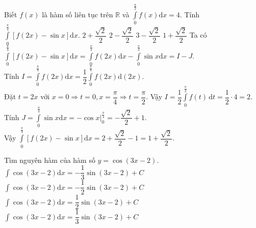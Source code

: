 \begin{ex}%
Biết $f(x)$ là hàm số liên tục trên $\mathbb{R}$ và $\displaystyle\int\limits_0^{\frac{\pi}{2}}f(x)\mathrm{d}x=4$. Tính $\displaystyle\int\limits_0^{\frac{\pi}{4}}\left[f(2x)-\sin x\right]\mathrm{d}x$.
\choice
{$2+\dfrac{\sqrt{2}}{2}$}
{$2-\dfrac{\sqrt{2}}{2}$}
{$3-\dfrac{\sqrt{2}}{2}$}
{\True $1+\dfrac{\sqrt{2}}{2}$}
\loigiai
{Ta có $\displaystyle\int\limits_0^{\frac{\pi}{4}}\left[f(2x)-\sin x\right]\mathrm{d}x=\displaystyle\int\limits_0^{\frac{\pi}{4}}f(2x)\mathrm{d}x-\displaystyle\int\limits_0^{\frac{\pi}{4}}\sin x\mathrm{d}x=I-J$.\\Tính $I=\displaystyle\int\limits_0^{\frac{\pi}{4}}f(2x)\mathrm{d}x=\dfrac{1}{2}\displaystyle\int\limits_0^{\frac{\pi}{4}}f(2x)\mathrm{d}(2x)$.\\
Đặt $ t=2x $ với $x=0\Rightarrow t=0, x=\dfrac{\pi}{4}\Rightarrow t=\dfrac{\pi}{2} $. Vậy $ I=\dfrac{1}{2}\displaystyle\int\limits_0^{\frac{\pi}{2}} f(t) \mathrm{\,d}t=\dfrac{1}{2}\cdot 4=2 $.\\
Tính $J=\displaystyle\int\limits_0^{\frac{\pi}{4}}\sin x\mathrm{d}x=-\cos x \bigg | _0^{\frac{\pi}{4}}=-\dfrac{\sqrt{2}}{2}+1$.\\
Vậy $\displaystyle\int\limits_0^{\frac{\pi}{4}}\left[f(2x)-\sin x\right]\mathrm{d}x=2+\dfrac{\sqrt{2}}{2}-1=1+\dfrac{\sqrt{2}}{2}$.
}
\end{ex}

\begin{ex}%
Tìm nguyên hàm của hàm số $y=\cos(3x-2)$.
\choice
{$\displaystyle\int\cos(3x-2)\mathrm{d}x=-\dfrac{1}{3}\sin(3x-2)+C$}
{$\displaystyle\int\cos(3x-2)\mathrm{d}x=-\dfrac{1}{2}\sin(3x-2)+C$}
{$\displaystyle\int\cos(3x-2)\mathrm{d}x=\dfrac{1}{2}\sin(3x-2)+C$}
{\True $\displaystyle\int\cos(3x-2)\mathrm{d}x=\dfrac{1}{3}\sin(3x-2)+C$}
\end{ex}

